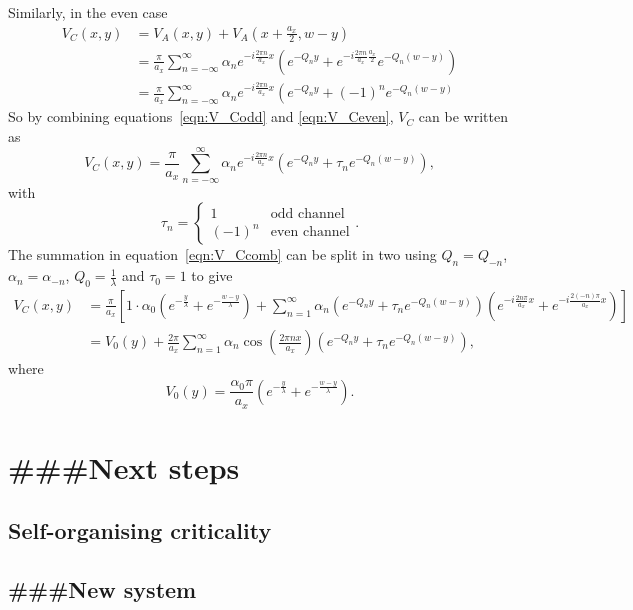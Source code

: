 \documentclass{article}
\numberwithin{equation}{section}
\begin{document}
Similarly, in the even case
\begin{align}
    V_C(x, y) &= V_A(x, y) + V_A(x+\frac{a_x}{2}, w-y) \nonumber \\
    &= \frac{\pi}{a_x}\sum_{n=-\infty}^\infty\alpha_n e^{-i\frac{2\pi n}{a_x}x} \left(e^{-Q_ny}+e^{-i\frac{2\pi n}{a_x}\frac{a_x}{2}}e^{-Q_n(w-y)}\right) \nonumber \\
    &= \frac{\pi}{a_x}\sum_{n=-\infty}^\infty\alpha_n e^{-i\frac{2\pi n}{a_x}x} \left(e^{-Q_ny}+(-1)^ne^{-Q_n(w-y)}\right. \label{eqn:V_Ceven}
\end{align}
So by combining equations~\ref{eqn:V_Codd} and \ref{eqn:V_Ceven}, $V_C$ can be written as
\begin{equation}
    V_C(x, y) = \frac{\pi}{a_x}\sum_{n=-\infty}^\infty\alpha_n e^{-i\frac{2\pi n}{a_x}x} \left(e^{-Q_ny}+\tau_ne^{-Q_n(w-y)}\right), \label{eqn:V_Ccomb}
\end{equation}
with
\begin{equation}
    \tau_n = \left\{
    \begin{array}{ll}
        1 & \textrm{odd channel} \\
        (-1)^n & \textrm{even channel}
    \end{array}
    \right ..
\end{equation}
The summation in equation~\ref{eqn:V_Ccomb} can be split in two using $Q_n = Q_{-n}$, $\alpha_n = \alpha_{-n}$, $Q_0 = \frac{1}{\lambda}$ and $\tau_0 = 1$ to give
\begin{align}
    V_C(x, y) &= \frac{\pi}{a_x} \left[1\cdot\alpha_0\left(e^{-\frac{y}{\lambda}}+e^{-\frac{w-y}{\lambda}}\right) +\sum_{n=1}^\infty\alpha_n\left(e^{-Q_ny}+\tau_ne^{-Q_n(w-y)}\right) \left(e^{-i\frac{2n\pi}{a_x}x}+e^{-i\frac{2(-n)\pi}{a_x}x}\right) \right] \nonumber \\
    &= V_0(y) + \frac{2\pi}{a_x}\sum_{n=1}^\infty\alpha_n\cos\left(\frac{2\pi nx}{a_x}\right) \left(e^{-Q_ny}+\tau_ne^{-Q_n(w-y)}\right),
\end{align}
where
\begin{equation}
    V_0(y) = \frac{\alpha_0\pi}{a_x}\left(e^{-\frac{y}{\lambda}}+e^{-\frac{w-y}{\lambda}}\right).
\end{equation}

\section{\#\#\#Next steps}
\subsection{Self-organising criticality}
\subsection{\#\#\#New system}

\printbibliography
\end{document}

